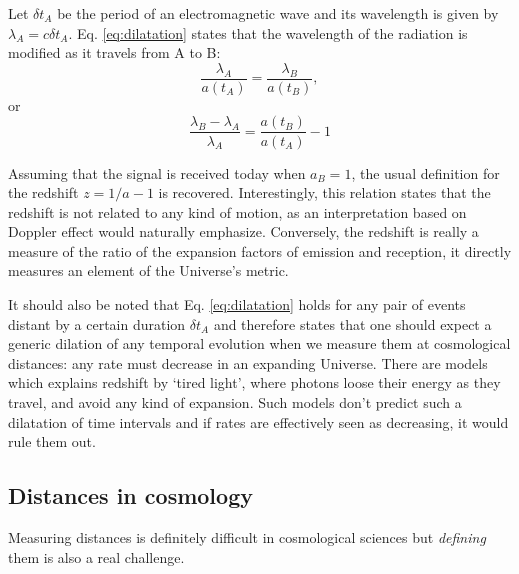 Let $\delta t_A$ be the period of an electromagnetic wave and its wavelength is given by $\lambda_A=c\delta t_A$. Eq. \ref{eq:dilatation} states that the wavelength of the radiation is modified as it travels from A to B:
\begin{equation}
	\frac{\lambda_A}{a(t_A)}=\frac{\lambda_B}{a(t_B)},
\end{equation}
or
\begin{equation}
	\frac{\lambda_B-\lambda_A}{\lambda_A}=\frac{a(t_B)}{a(t_A)}-1
\end{equation}

Assuming that the signal is received today when $a_B=1$, the usual definition for the redshift $z=1/a-1$ is recovered. Interestingly, this relation states that the redshift is not related to any kind of motion, as an interpretation based on Doppler effect would naturally emphasize. Conversely, the redshift is really a measure of the ratio of the expansion factors of emission and reception, it directly measures an element of the Universe's metric. 

It should also be noted that Eq. \ref{eq:dilatation} holds for any pair of events distant by a certain duration $\delta t_A$ and therefore states that one should expect a generic dilation of any temporal evolution when we measure them at cosmological distances: any rate must decrease in an expanding Universe. There are models which explains redshift by `tired light', where photons loose their energy as they travel, and avoid any kind of expansion. Such models don't predict such a dilatation of time intervals and if rates are effectively seen as decreasing, it would rule them out.
\subsection{Distances in cosmology} %
\label{sub:distances_in_cosmology}
Measuring distances is definitely difficult in cosmological sciences but \emph{defining} them is also a real challenge.

